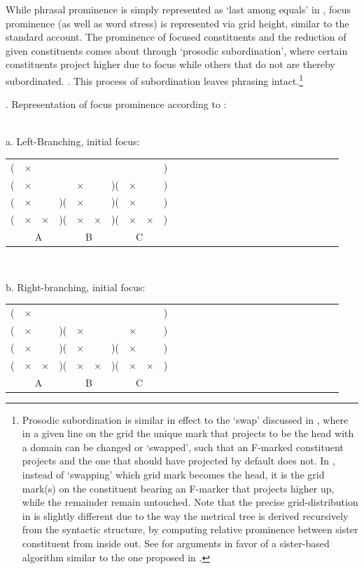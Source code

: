 \documentclass[preprint,review,12pt,authoryear,times]{elsarticle}
\newcommand{\g}{$\times$}
\begin{document}
While phrasal prominence is simply represented as `last among equals' in \citet{wagner05recursion}, focus prominence (as well as word stress) is represented via grid height, similar to the standard account. The prominence of focused constituents and the reduction of given constituents comes about through `prosodic subordination', where certain constituents project higher due to focus while others that do not are thereby subordinated. \citet{wagner05recursion}. This process of subordination  leaves phrasing intact.\footnote{Prosodic subordination is similar in effect to the `swap' discussed in \citet{burin10typology}, where in a given line on the grid the unique mark that projects to be the head with a domain can be changed or `swapped', such that an F-marked constituent projects and the one that should have projected by default does not. In \citet{wagner05recursion}, instead of `swapping' which grid mark becomes the head, it is the grid mark(s) on the constituent bearing an F-marker that projects higher up, while the remainder remain untouched. Note that the precise grid-distribution in \citet{wagner05recursion} is slightly different due to the way the metrical tree is derived recursively from the syntactic structure, by computing relative prominence between sister constituent from inside out. See \citet{burin16b} for arguments in favor of a sister-based algorithm similar to the one proposed in  \citet{wagner05recursion}.}

\ex.  Representation of focus prominence according to  \citet{wagner05recursion,wagner10nllt}:\\\label{focpromYo}
\vspace{-10pt}
\ \\
\parbox{2in}{\footnotesize a. Left-Branching, initial focus:\\
\vspace{-12pt}
\setlength{\unitlength}{1cm}
 \setlength\extrarowheight{-3pt}
 \begin{tabular}{ccccccccccccccccccccccccccc}
(&\g&&&&&&&&)&\\
(&\g&&&\g&&)(&\g&&)&\\
(&\g&&)(&\g&&)(&\g&&)&\\
(&\g&\g&)(&\g&\g&)(&\g&\g&)&\\
\multicolumn{4}{c}{A}&\multicolumn{2}{c}{B}&\multicolumn{4}{c}{C}\\
\end{tabular}
}\parbox{0,45in}{\ }\parbox{2in}{\footnotesize b. Right-branching, initial focus:\\
\vspace{-12pt}
\setlength{\unitlength}{1cm}
 \setlength\extrarowheight{-3pt}
 \begin{tabular}{ccccccccccccccccccccccccccc}
(&\g&&&&&&&&)&\\
(&\g&&)(&\g&&&\g&&)&\\
(&\g&&)(&\g&&)(&\g&&)&\\
(&\g&\g&)(&\g&\g&)(&\g&\g&)&\\
\multicolumn{4}{c}{A}&\multicolumn{2}{c}{B}&\multicolumn{4}{c}{C}\\
\end{tabular}
}\label{libhi2}
\end{document}
